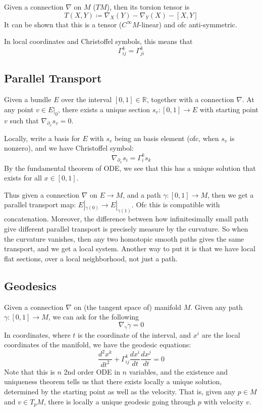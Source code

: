 \documentclass[main.tex]{subfiles}
\begin{document}
\begin{definition}Given a connection $\nabla$ on $M$ ($TM$), then its torsion tensor is 
$$
T(X,Y) \coloneqq \nabla_X(Y) - \nabla_Y(X) - [X,Y]
$$
It can be shown that this is a tensor ($C^{\infty}M$-linear) and ofc anti-symmetric.
\end{definition}

In local coordinates and Christoffel symbols, this means that 
$$
\Gamma_{ij}^k = \Gamma_{ji}^k
$$
\subsection{Parallel Transport}
Given a bundle $E$ over the interval $[0,1] \in \mathbb{R}$, together with a connection $\nabla$. At any point $v \in E|_0$, there exists a unique section $s_v : [0,1] \rightarrow E$ with starting point $v$ such that $\nabla_{\partial_x} s_v = 0$.

Locally, write a basis for $E$ with $s_v$ being an basis element (ofc, when $s_v$ is nonzero), and we have Christoffel symbol:
$$
\nabla_{\partial_x} s_i = \Gamma_{i}^k s_k
$$
By the fundamental theorem of ODE, we see that this has a unique solution that exists for all $x \in [0,1]$.

Thus given a connection $\nabla$ on $E \rightarrow M$, and a path $\gamma: [0,1] \rightarrow M$, then we get a parallel transport map: $E|_{\gamma(0)} \rightarrow E|_{\gamma(1)} $. Ofc this is compatible with concatenation. Moreover, the difference between how infinitesimally small path give different parallel transport is precisely measure by the curvature. So when the curvature vanishes, then any two homotopic smooth paths gives the same transport, and we get a local system. Another way to put it is that we have local flat sections, over a local neighborhood, not just a path.

\subsection{Geodesics}
Given a connection $\nabla$ on (the tangent space of) manifold $M$. Given any path $\gamma: [0,1] \rightarrow M$, we can ask for the following
$$
\nabla_{\dot{\gamma}} \dot{\gamma} = 0
$$
In coordinates, where $t$ is the coordinate of the interval, and $x^i$ are the local coordinates of the manifold, we have the geodesic equations:
$$
\frac{d^2 x^k}{dt ^2} + \Gamma_{ij}^k \frac{dx^i}{dt} \frac{dx^j}{dt} = 0
$$
Note that this is $n$ 2nd order ODE in $n$ variables, and the existence and uniqueness theorem tells us that there exists locally a unique solution, determined by the starting point as well as the velocity. That is, given any $p \in M$ and $v \in T_p M$, there is locally a unique geodesic going through $p$ with velocity $v$.
\end{document}
